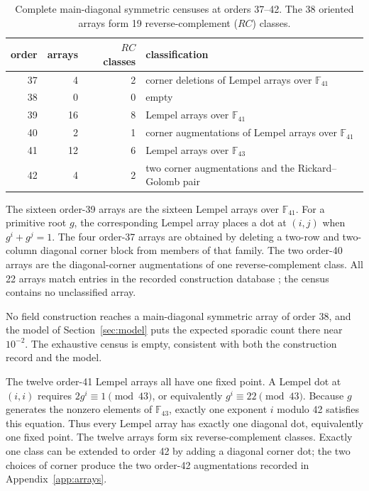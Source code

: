 \documentclass[11pt]{article}
\begin{document}
\begin{table}[ht]
\centering
\begin{tabular}{rrrl}
\toprule
order & arrays & $RC$ classes & classification \\
\midrule
37 & 4 & 2 & corner deletions of Lempel arrays over $\mathbb{F}_{41}$ \\
38 & 0 & 0 & empty \\
39 & 16 & 8 & Lempel arrays over $\mathbb{F}_{41}$ \\
40 & 2 & 1 & corner augmentations of Lempel arrays over $\mathbb{F}_{41}$ \\
41 & 12 & 6 & Lempel arrays over $\mathbb{F}_{43}$ \\
42 & 4 & 2 & two corner augmentations and the Rickard--Golomb pair \\
\bottomrule
\end{tabular}
\caption{Complete main-diagonal symmetric censuses at orders 37--42.
The 38 oriented arrays form 19 reverse-complement ($RC$) classes.}
\label{tab:census}
\end{table}

The sixteen order-39 arrays are the
sixteen Lempel arrays over $\mathbb{F}_{41}$.  For a primitive root $g$,
the corresponding Lempel array places a dot at $(i,j)$ when
$g^{i}+g^{j}=1$.  The four order-37 arrays are obtained by deleting a
two-row and two-column diagonal corner block from members of that family.
The two order-40 arrays are the diagonal-corner augmentations of one
reverse-complement class.  All 22 arrays match entries in the recorded
construction database \cite{BeardDataPort2017}; the census contains no
unclassified array.

No field construction reaches a main-diagonal
symmetric array of order 38, and the model of Section~\ref{sec:model} puts the
expected sporadic count there near $10^{-2}$.  The exhaustive census is
empty, consistent with both the construction record and the model.

The twelve order-41 Lempel arrays all have one fixed point.  A Lempel dot
at $(i,i)$ requires $2g^{i}\equiv 1 \pmod{43}$, or equivalently
$g^i\equiv22\pmod{43}$.  Because $g$ generates the nonzero elements of
$\mathbb{F}_{43}$, exactly one exponent $i$ modulo 42 satisfies this
equation.  Thus every Lempel array has exactly one diagonal dot,
equivalently one fixed point.  The twelve arrays form six
reverse-complement classes.  Exactly one class can be extended to order
42 by adding a diagonal corner dot; the two choices of corner produce the
two order-42 augmentations recorded in Appendix~\ref{app:arrays}.
\end{document}

